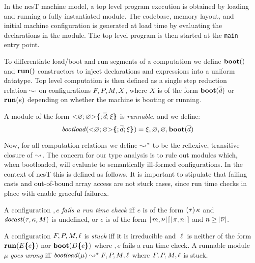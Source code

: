 In the nesT machine model, a top level program execution is obtained by loading and running a
fully instantiated module. The codebase, memory layout, and initial machine configuration is
generated at load time by evaluating the declarations in the module. The top level program is
then started at the \texttt{main} entry point.

To differentiate load/boot and run segments of a computation we define $\mathbf{boot}()$ and
$\mathbf{run}()$ constructors to inject declarations and expressions into a uniform datatype. Top
level computation is then defined as a single step reduction relation $\leadsto$ on
configurations $F,P,M,X$, where $X$ is of the form $\mathbf{boot}(\overline{d})$ or
$\mathbf{run}(e)$ depending on whether the machine is booting or running.
\begin{definition}
  A module of the form $\mathrm{<}\varnothing; \varnothing \mathrm{>}\textup{\textbf{\{}} ; \overline{d}; \xi\textup{\textbf{\}}}$ is
  \emph{runnable}, and we define:
$$\mathit{bootload}(\mathrm{<}\varnothing; \varnothing \mathrm{>}\textup{\textbf{\{}} ; \overline{d}; \xi\textup{\textbf{\}}}) =
\xi,\varnothing,\varnothing, \mathbf{boot}(\overline{d})$$
\end{definition}

Now, for all computation relations we define $\leadsto^*$ to be the reflexive, transitive
closure of $\leadsto$. The concern for our type analysis is to rule out modules which, when
bootloaded, will evaluate to semantically ill-formed configurations. In the context of nesT this
is defined as follows. It is important to stipulate that failing casts and out-of-bound array
access are not stuck cases, since run time checks in place with enable graceful failurex.
\begin{definition}
  A configuration $\bm, e$ \emph{fails a run time check} iff $e$ is of the form
  $(\tau)\,\kappa$ and $\mathit{docast}(\tau,\kappa,M)$ is undefined, or $e$ is of the form
  $\lfloor m,{\nu} \rfloor[\lfloor \pi,n \rfloor]$ and $n\ge|\overline{{\nu}}|$.
\end{definition}

\begin{definition}
\label{def-runnable}
A configuration $F, P, M, \ell$ is \emph{stuck} iff it is irreducible and $\ell$ is
neither of the form $\mathbf{run}(E\textup{\textbf{\{}} e\textup{\textbf{\}}})$ nor $\mathbf{boot}(D\textup{\textbf{\{}} e\textup{\textbf{\}}})$ where $\bm, e$
fails a run time check. A runnable module $\mu$ \emph{goes wrong} iff $\mathit{bootload}(\mu)
\leadsto^\star F, P, M, \ell $ where $F, P, M, \ell$ is stuck.
\end{definition}

